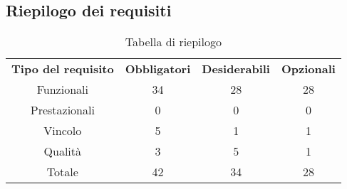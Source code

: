 \subsection{Riepilogo dei requisiti}
\begin{table}[h]
\centering
\begin{tabular}{| c | c | c | c |}
		\rowcolor{LightBlue}
		\color{white}\bfseries Tipo del requisito & \color{white}\bfseries Obbligatori & \color{white}\bfseries Desiderabili & \color{white}\bfseries Opzionali \\[0.25cm]
		 Funzionali & 34 & 28 & 28 \\
		 Prestazionali & 0 & 0 & 0 \\
		 Vincolo & 5 & 1 & 1 \\
		 Qualità & 3 & 5 & 1 \\
		 Totale & 42 & 34 & 28 \\ \hline
\end{tabular}
		\caption{Tabella di riepilogo}
\end{table}


\newpage
